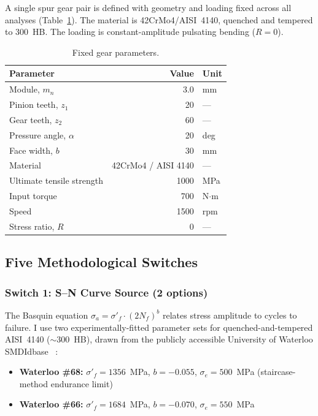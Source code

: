 \documentclass[12pt,a4paper]{article}
\begin{document}
A single spur gear pair is defined with geometry and loading fixed
across all analyses (Table~\ref{tab:gear}). The material is
42CrMo4/AISI~4140, quenched and tempered to 300~HB. The loading is
constant-amplitude pulsating bending ($R=0$).

\begin{table}[h]
\centering
\caption{Fixed gear parameters.}
\label{tab:gear}
\begin{tabular}{lrl}
\toprule
Parameter & Value & Unit \\
\midrule
Module, $m_n$ & 3.0 & mm \\
Pinion teeth, $z_1$ & 20 & --- \\
Gear teeth, $z_2$ & 60 & --- \\
Pressure angle, $\alpha$ & 20 & deg \\
Face width, $b$ & 30 & mm \\
Material & 42CrMo4 / AISI 4140 & --- \\
Ultimate tensile strength & 1000 & MPa \\
Input torque & 700 & N$\cdot$m \\
Speed & 1500 & rpm \\
Stress ratio, $R$ & 0 & --- \\
\bottomrule
\end{tabular}
\end{table}

\subsection{Five Methodological Switches}

\subsubsection{Switch 1: S--N Curve Source (2 options)}

The Basquin equation $\sigma_a = \sigma'_f \cdot (2N_f)^b$ relates
stress amplitude to cycles to failure. I use two experimentally-fitted
parameter sets for quenched-and-tempered AISI~4140 ($\sim$300~HB),
drawn from the publicly accessible University of Waterloo SMDIdbase%
~\cite{waterloo_fde}:

\begin{itemize}
  \item \textbf{Waterloo \#68:} $\sigma'_f = 1356$~MPa, $b=-0.055$,
        $\sigma_e=500$~MPa (staircase-method endurance limit)
  \item \textbf{Waterloo \#66:} $\sigma'_f = 1684$~MPa, $b=-0.070$,
        $\sigma_e=550$~MPa
\end{itemize}
\end{document}

